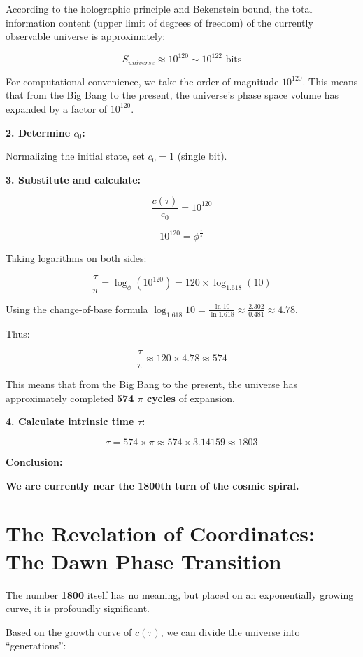 \documentclass[11pt,a4paper,twoside]{book}
\begin{document}
According to the holographic principle and Bekenstein bound, the total information content (upper limit of degrees of freedom) of the currently observable universe is approximately:

$$S_{universe} \approx 10^{120} \sim 10^{122} \text{ bits}$$

For computational convenience, we take the order of magnitude \textbf{$10^{120}$}. This means that from the Big Bang to the present, the universe's phase space volume has expanded by a factor of $10^{120}$.

\textbf{2. Determine $c_0$:}

Normalizing the initial state, set $c_0 = 1$ (single bit).

\textbf{3. Substitute and calculate:}

$$\frac{c(\tau)}{c_0} = 10^{120}$$

$$10^{120} = \phi^{\frac{\tau}{\pi}}$$

Taking logarithms on both sides:

$$\frac{\tau}{\pi} = \log_{\phi} (10^{120}) = 120 \times \log_{1.618} (10)$$

Using the change-of-base formula $\log_{1.618} 10 = \frac{\ln 10}{\ln 1.618} \approx \frac{2.302}{0.481} \approx 4.78$.

Thus:

$$\frac{\tau}{\pi} \approx 120 \times 4.78 \approx 574$$

This means that from the Big Bang to the present, the universe has approximately completed \textbf{574 $\pi$ cycles} of expansion.

\textbf{4. Calculate intrinsic time $\tau$:}

$$\tau = 574 \times \pi \approx 574 \times 3.14159 \approx 1803$$

\textbf{Conclusion:}

\textbf{We are currently near the 1800th turn of the cosmic spiral.}

\section{The Revelation of Coordinates: The Dawn Phase Transition}

The number \textbf{1800} itself has no meaning, but placed on an exponentially growing curve, it is profoundly significant.

Based on the growth curve of $c(\tau)$, we can divide the universe into ``generations'':
\end{document}
